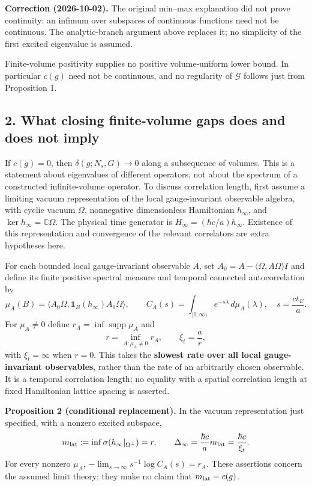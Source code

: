\documentclass[11pt,a4paper]{article}
\begin{document}
\textbf{Correction (2026-10-02).} The original min--max explanation did
not prove continuity: an infimum over subspaces of continuous functions
need not be continuous. The analytic-branch argument above replaces it;
no simplicity of the first excited eigenvalue is assumed.

Finite-volume positivity supplies no positive volume-uniform lower
bound. In particular \(c(g)\) need not be continuous, and no regularity
of \(\mathcal G\) follows just from Proposition 1.

\subsection{2. What closing finite-volume gaps does and does not
imply}\label{what-closing-finite-volume-gaps-does-and-does-not-imply}

If \(c(g)=0\), then \(\delta(g;N_s,G)\to0\) along a subsequence of
volumes. This is a statement about eigenvalues of different operators,
not about the spectrum of a constructed infinite-volume operator. To
discuss correlation length, first assume a limiting vacuum
representation of the local gauge-invariant observable algebra, with
cyclic vacuum \(\Omega\), nonnegative dimensionless Hamiltonian
\(h_\infty\), and \(\ker h_\infty=\mathbb C\Omega\). The physical time
generator is \(H_\infty=(\hbar c/a)h_\infty\). Existence of this
representation and convergence of the relevant correlators are extra
hypotheses here.

For each bounded local gauge-invariant observable \(A\), set
\(A_0=A-\langle\Omega,A\Omega\rangle I\) and define its finite positive
spectral measure and temporal connected autocorrelation by
\[\mu_A(B)=\langle A_0\Omega,\mathbf1_B(h_\infty)A_0\Omega\rangle,
\qquad C_A(s)=\int_{[0,\infty)}e^{-s\lambda}\,d\mu_A(\lambda),
\quad s=\frac{ct_E}{a}.\] For \(\mu_A\ne0\) define
\(r_A=\inf\operatorname{supp}\mu_A\) and
\[r=\inf_{A:\mu_A\ne0}r_A,\qquad \xi_t=\frac{a}{r},\] with
\(\xi_t=\infty\) when \(r=0\). This takes the \textbf{slowest rate over
all local gauge-invariant observables}, rather than the rate of an
arbitrarily chosen observable. It is a temporal correlation length; no
equality with a spatial correlation length at fixed Hamiltonian lattice
spacing is asserted.

\textbf{Proposition 2 (conditional replacement).} In the vacuum
representation just specified, with a nonzero excited subspace,
\[m_{\rm lat}:=\inf\sigma(h_\infty|_{\Omega^\perp})=r,
\qquad \Delta_\infty=\frac{\hbar c}{a}m_{\rm lat}
=\frac{\hbar c}{\xi_t}.\] For every nonzero \(\mu_A\),
\(-\lim_{s\to\infty}s^{-1}\log C_A(s)=r_A\). These assertions concern
the assumed limit theory; they make no claim that \(m_{\rm lat}=c(g)\).
\end{document}
